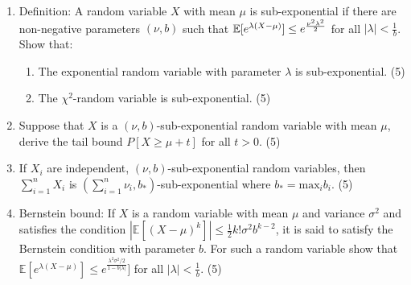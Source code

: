 \documentclass{article}
\begin{document}
\begin{enumerate}
\item{Definition: A random variable $X$ with mean $\mu$ is sub-exponential if there are non-negative parameters $(\nu, b)$ such that $\mathbb{E}[e^{\lambda(X - \mu)}] \leq e^{\frac{\nu^2\\\lambda^2}{2}}$ for all $|\lambda| < \frac{1}{b}$. Show that:
\begin{enumerate}
\item{The exponential random variable with parameter $\lambda$ is sub-exponential. (5)}
\item{The $\chi^2$-random variable is sub-exponential. (5)}
\end{enumerate}}
\item{Suppose that $X$ is a $(\nu, b)$-sub-exponential random variable with mean $\mu$, derive the tail bound $P[X \geq \mu + t]$ for all $t > 0$. (5)}
\item{If $X_i$ are independent, $(\nu, b)$-sub-exponential random variables, then $\sum\limits_{i=1}^n X_i$ is $(\sum\limits_{i=1}^n \nu_i, b_*)$-sub-exponential where $b_* = \text{max}_i b_i$. (5)}
\item{Bernstein bound: If $X$ is a random variable with mean $\mu$ and variance $\sigma^2$ and satisfies the condition $|\mathbb{E}[(X - \mu)^k]| \leq \frac{1}{2}k!\sigma^2b^{k-2}$, it is said to satisfy the Bernstein condition with parameter $b$. For such a random variable show that $\mathbb{E}[e^{\lambda(X - \mu)}]\leq e^{\frac{\lambda^2\sigma^2/2}{1 - b|\lambda|}}]$ for all $|\lambda| < \frac{1}{b}$. (5)}
\end{enumerate}
\end{document}
